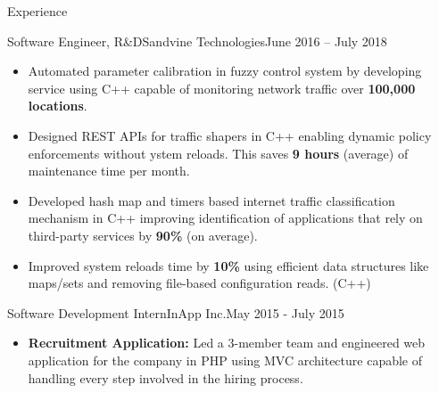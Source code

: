 \documentclass[]{mcdowellcv}
\begin{document}
	\begin{cvsection}{Experience}
		\begin{cvsubsection}{Software Engineer, R\&D}{Sandvine Technologies}{June 2016 -- July 2018}
			\begin{itemize}
				\item Automated parameter calibration in fuzzy control system by developing service using C++ capable of monitoring network traffic over \textbf{100,000 locations}.
				\item Designed REST APIs for traffic shapers in C++ enabling dynamic policy enforcements without ystem reloads. This saves \textbf{9 hours} (average) of maintenance time per month.
				\item Developed hash map and timers based internet traffic classification mechanism in C++ improving identification of applications that rely on third-party services by \textbf{90\%} (on average).
				\item Improved system reloads time by \textbf{10\%} using efficient data structures like maps/sets and removing file-based configuration reads. (C++)
			\end{itemize}
		\end{cvsubsection}
		
		\begin{cvsubsection}{Software Development Intern}{InApp Inc.}{May 2015 - July 2015}
			\begin{itemize}
				\item \textbf{Recruitment Application:} Led a 3-member team and engineered web application for the company in PHP using MVC architecture capable of handling every step involved in the hiring process.
			\end{itemize}
		\end{cvsubsection}
	\end{cvsection}
	
	
	
\end{document}
